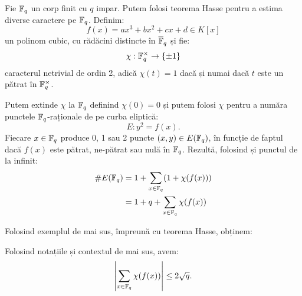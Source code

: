 \begin{example}\label{exm:eliptic-fq}
    Fie $ \mathbb{F}_q $ un corp finit cu $ q $ impar. Putem folosi teorema Hasse pentru a estima
    diverse caractere pe $ \mathbb{F}_q $. Definim:
    \[
        f(x) = ax^3 + bx^2 + cx + d \in K[x]
    \]
    un polinom cubic, cu rădăcini distincte în $ \overline{\mathbb{F}}_q $ și fie:
    \[
        \chi : \mathbb{F}_q^\times \to \{ \pm 1 \}
    \]
    caracterul netrivial de ordin 2, adică $ \chi(t) = 1 $ dacă și numai dacă
    $ t $ este un pătrat în $ \mathbb{F}_q^\times $.

    Putem extinde $ \chi $ la $ \mathbb{F}_q $ definind $ \chi(0) = 0 $ și putem folosi
    $ \chi $ pentru a număra punctele $ \mathbb{F}_q $-raționale de pe curba eliptică:
    \[
        E : y^2 = f(x).
    \]
    Fiecare $ x \in \mathbb{F}_q $ produce 0, 1 sau 2 puncte $ (x, y) \in E(\mathbb{F}_q) $, în
    funcție de faptul dacă $ f(x) $ este pătrat, ne-pătrat sau nulă în $ \mathbb{F}_q $.
    Rezultă, folosind și punctul de la infinit:
    \begin{align*}
        \# E(\mathbb{F}_q) &= 1 + \sum_{x \in \mathbb{F}_q} (1 + \chi(f(x))) \\
                    &= 1 + q + \sum_{x \in \mathbb{F}_q} \chi(f(x))
    \end{align*}
\end{example}

Folosind exemplul de mai sus, împreună cu teorema Hasse, obținem:
\begin{corollary}\label{cor:hass-char}
    Folosind notațiile și contextul de mai sus, avem:
    \[
        \left| \sum_{x \in \mathbb{F}_q} \chi(f(x)) \right| \leq 2 \sqrt{q}.
    \]
\end{corollary}



